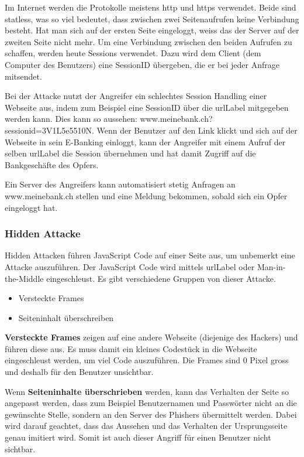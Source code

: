 Im Internet werden die Protokolle meistens http und https verwendet. Beide sind statless, was so viel bedeutet, dass zwischen zwei Seitenaufrufen keine Verbindung besteht. Hat man sich auf der ersten Seite eingeloggt, weiss das der Server auf der zweiten Seite nicht mehr. Um eine Verbindung zwischen den beiden Aufrufen zu schaffen, werden heute Sessions verwendet. Dazu wird dem Client (dem Computer des Benutzers) eine SessionID übergeben, die er bei jeder Anfrage mitsendet.

Bei der Attacke nutzt der Angreifer ein schlechtes Session Handling einer Webseite aus, indem zum Beispiel eine SessionID über die \Gls{urlLabel} mitgegeben werden kann. Dies kann so aussehen: www.meinebank.ch?sessionid=3V1L5e5510N. Wenn der Benutzer auf den Link klickt und sich auf der Webseite in sein E-Banking einloggt, kann der Angreifer mit einem Aufruf der selben \Gls{urlLabel} die Session übernehmen und hat damit Zugriff auf die Bankgeschäfte des Opfers.

Ein Server des Angreifers kann automatisiert stetig Anfragen an www.meinebank.ch stellen und eine Meldung bekommen, sobald sich ein Opfer eingeloggt hat.

\subsubsection{Hidden Attacke}
Hidden Attacken führen JavaScript Code auf einer Seite aus, um unbemerkt eine Attacke auszuführen. Der JavaScript Code wird mittels \Gls{urlLabel} oder Man-in-the-Middle eingeschleust. Es gibt verschiedene Gruppen von dieser Attacke.
\begin{itemize}
\item Versteckte Frames
\item Seiteninhalt überschreiben
\end{itemize}
\textbf{Versteckte Frames} zeigen auf eine andere Webseite (diejenige des Hackers) und führen diese aus. Es muss damit ein kleines Codestück in die Webseite eingeschleust werden, um viel Code auszuführen. Die Frames sind 0 Pixel gross und deshalb für den Benutzer unsichtbar.

Wenn \textbf{Seiteninhalte überschrieben} werden, kann das Verhalten der Seite so angepasst werden, dass zum Beispiel Benutzernamen und Passwörter nicht an die gewünschte Stelle, sondern an den Server des Phishers übermittelt werden. Dabei wird darauf geachtet, dass das Aussehen und das Verhalten der Ursprungsseite genau imitiert wird. Somit ist auch dieser Angriff für einen Benutzer nicht sichtbar.

